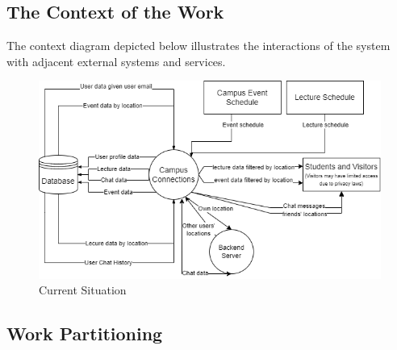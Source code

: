 \documentclass[12pt]{article}
\begin{document}
\subsection{The Context of the Work}

The context diagram depicted below illustrates the interactions of the system with adjacent external systems and services.
\begin{figure}[H]
\begin{center}
\includegraphics[scale=0.7]{Context_Diagram.png}
\end{center}
\caption{Current Situation}
\end{figure}

\subsection{Work Partitioning}
\end{document}
